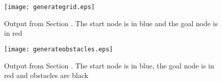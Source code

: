 \documentclass[Space3_Assign3.tex]{subfile}
\begin{document}
\begin{figure}[h]
\centering
\caption{Output from Section . The start node is in blue and the goal node is in red}
\label{Fig:gengrid}
\texttt{[image: generategrid.eps]}
\end{figure}

\begin{figure}[h]
\centering
\caption{Output from Section . The start node is in blue, the goal node is in red and obstacles are black}
\label{Fig:genobs}
\texttt{[image: generateobstacles.eps]}
\end{figure}
\end{document}
